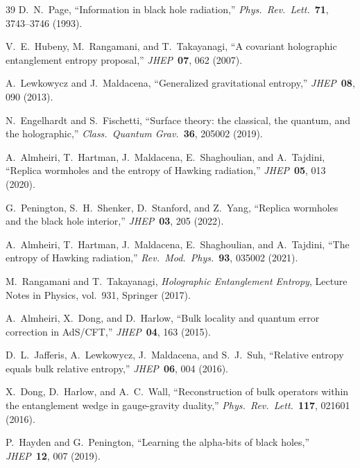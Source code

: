 \documentclass[11pt,a4paper]{article}
\theoremstyle{plain}
\theoremstyle{definition}
\begin{document}
\begin{thebibliography}{39}
D.~N.~Page,
``Information in black hole radiation,''
\emph{Phys.\ Rev.\ Lett.}\ \textbf{71}, 3743--3746 (1993).

V.~E.~Hubeny, M.~Rangamani, and T.~Takayanagi,
``A covariant holographic entanglement entropy proposal,''
\emph{JHEP}\ \textbf{07}, 062 (2007).

A.~Lewkowycz and J.~Maldacena,
``Generalized gravitational entropy,''
\emph{JHEP}\ \textbf{08}, 090 (2013).

N.~Engelhardt and S.~Fischetti,
``Surface theory: the classical, the quantum, and the holographic,''
\emph{Class.\ Quantum Grav.}\ \textbf{36}, 205002 (2019).

A.~Almheiri, T.~Hartman, J.~Maldacena, E.~Shaghoulian, and A.~Tajdini,
``Replica wormholes and the entropy of Hawking radiation,''
\emph{JHEP}\ \textbf{05}, 013 (2020).

G.~Penington, S.~H.~Shenker, D.~Stanford, and Z.~Yang,
``Replica wormholes and the black hole interior,''
\emph{JHEP}\ \textbf{03}, 205 (2022).

A.~Almheiri, T.~Hartman, J.~Maldacena, E.~Shaghoulian, and A.~Tajdini,
``The entropy of Hawking radiation,''
\emph{Rev.\ Mod.\ Phys.}\ \textbf{93}, 035002 (2021).

M.~Rangamani and T.~Takayanagi,
\emph{Holographic Entanglement Entropy},
Lecture Notes in Physics, vol.~931, Springer (2017).

A.~Almheiri, X.~Dong, and D.~Harlow,
``Bulk locality and quantum error correction in AdS/CFT,''
\emph{JHEP}\ \textbf{04}, 163 (2015).

D.~L.~Jafferis, A.~Lewkowycz, J.~Maldacena, and S.~J.~Suh,
``Relative entropy equals bulk relative entropy,''
\emph{JHEP}\ \textbf{06}, 004 (2016).

X.~Dong, D.~Harlow, and A.~C.~Wall,
``Reconstruction of bulk operators within the entanglement wedge in
gauge-gravity duality,''
\emph{Phys.\ Rev.\ Lett.}\ \textbf{117}, 021601 (2016).

P.~Hayden and G.~Penington,
``Learning the alpha-bits of black holes,''
\emph{JHEP}\ \textbf{12}, 007 (2019).

\end{thebibliography}
\end{document}
